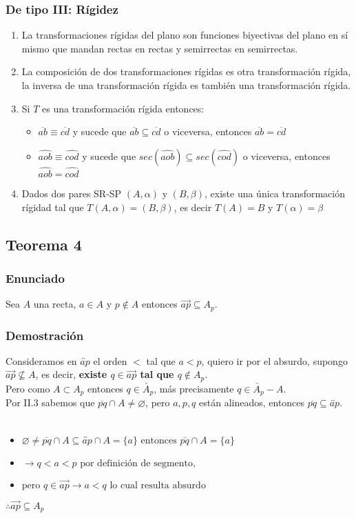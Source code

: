 \documentclass[a4paper]{article}
\begin{document}
\subsubsection{De tipo III: Rígidez}
\begin{enumerate}
    \item La transformaciones rígidas del plano son funciones biyectivas del plano en sí mismo que mandan rectas en rectas y semirrectas en semirrectas.
    \item La composición de dos transformaciones rígidas es otra transformación rígida, la inversa de una transformación rígida es también una transformación rígida. 
    \item Si $T$ es una transformación rígida entonces:
    \begin{itemize}
        \item $\overline{ab} \equiv \overline{cd}$ y sucede que $\overline{ab} \subseteq \overline{cd}$ o viceversa, entonces $\overline{ab}= \overline{cd}$
        \item $\hat{aob} \equiv \hat{cod}$  y sucede que $sec(\hat{aob}) \subseteq sec(\hat{cod})$ o viceversa, entonces $\hat{aob} = \hat{cod}$
    \end{itemize}
    \item Dados dos pares SR-SP $(A,\alpha)$ y $(B,\beta)$, existe una única transformación rígidad tal que $T(A,\alpha)=(B,\beta)$, es decir $T(A)=B$ y $T(\alpha)=\beta$
\end{enumerate}
\subsection{Teorema 4}
\subsubsection{Enunciado}
Sea $A$ una recta, $a \in A$ y $p \notin A$ entonces $\overrightarrow{ap} \subseteq A_p$.
\subsubsection{Demostración}
Consideramos en $\overleftrightarrow{ap}$ el orden $<$ tal que $a<p$, quiero ir por el absurdo, supongo $\overrightarrow{ap}\nsubseteq A$, es decir, \textbf{existe $q \in \overrightarrow{ap}$ tal que $q \notin A_p$}.\\
Pero como $A \subset A_p$ entonces $q \in \check{A_p}$, más precisamente $q \in \check{A_p}- A$.\\
Por II.3 sabemos que $\overline{pq} \cap A \neq \varnothing$, pero $a,p,q$ están alineados, entonces $\overline{pq} \subseteq\overleftrightarrow{ap}$.\\\\
\begin{itemize}
    \item $\varnothing \neq \overline{pq} \cap A \subseteq \overleftrightarrow{ap} \cap A =\{a\} \text{ entonces } \overline{pq} \cap A=\{a\}$
    \item $\rightarrow q<a<p \text{ por definición de segmento,}$
    \item $\text{pero } q \in \overrightarrow{ap} \rightarrow a<q \text{ lo cual resulta absurdo}$
\end{itemize}
$\therefore \overrightarrow{ap} \subseteq A_p$
\end{document}
